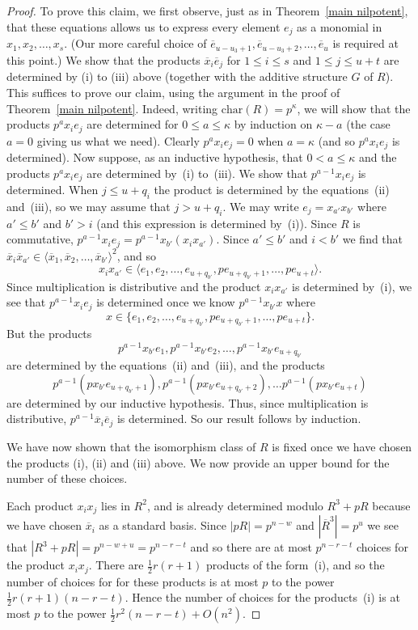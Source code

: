 \documentclass[12pt]{article}
\begin{document}
\begin{proof}
To prove this claim, we first observe, just as in Theorem~\ref{main nilpotent},  that these equations allows us to express every element $e_j$ as a monomial in $x_1,x_2,\ldots,x_s$. (Our more careful choice of $\overline{e}_{u-u_3+1},\overline{e}_{u-u_3+2},\ldots,\overline{e}_{u}$ is required at this point.) We show that the products $\overline{x}_{i}\overline{e}_{j}$ for $1\leq i\leq s$ and $1\leq j\leq u+t$ are determined by (i) to (iii) above (together with the additive structure $G$ of $R$). This suffices to prove our claim, using the argument in the proof of Theorem~\ref{main nilpotent}.   Indeed, writing $\mathrm{char}(R) = p^\kappa$, we will show that the products $p^ax_{i}e_{j}$ are determined for $0\leq a\leq \kappa$ by induction on $\kappa-a$ (the case $a=0$ giving us what we need). Clearly $p^ax_{i}e_{j}=0$ when $a=\kappa$ (and so $p^ax_{i}e_{j}$ is determined). Now suppose, as an inductive hypothesis, that $0<a\leq\kappa$ and the products $p^ax_{i}e_{j}$ are determined by~(i) to~(iii). We show that $p^{a-1}x_{i}e_{j}$ is determined. When $j\leq u+q_i$ the product is determined by the equations~(ii) and~(iii), so we may assume that $j>u+q_i$.  We may write $e_j=x_{a'}x_{b'}$ where $a'\leq b'$ and $b'>i$ (and this expression is determined by~(i)). Since $R$ is commutative, $p^{a-1}x_ie_j=p^{a-1}x_{b'}(x_ix_{a'})$. Since $a'\leq b'$ and $i<b'$ we find that $\overline{x}_i\overline{x}_{a'}\in\langle\overline{x}_1,\overline{x}_2,\ldots,\overline{x}_{b'}\rangle^2$, and so 
\[
x_ix_{a'}\in \langle e_1,e_2,\ldots,e_{u+q_{b'}},pe_{u+q_{b'}+1},\ldots,pe_{u+t}\rangle.
\]
Since multiplication is distributive and the product $x_ix_{a'}$ is determined by~(i), we see that $p^{a-1}x_ie_j$ is determined once we know $p^{a-1}x_{b'}x$ where
\[
x\in\{e_1,e_2,\ldots,e_{u+q_{b'}},pe_{u+q_{b'}+1},\ldots,pe_{u+t}\}.
\]
But the products
\[
p^{a-1}x_{b'}e_{1},p^{a-1}x_{b'}e_{2},\ldots,p^{a-1}x_{b'}e_{u+q_{b'}}
\]
are determined by the equations~(ii) and~(iii), and the products
\[
p^{a-1}(px_{b'}e_{u+q_{b'}+1}),p^{a-1}(px_{b'}e_{u+q_{b'}+2}),\ldots p^{a-1}(px_{b'}e_{u+t})
\]
are determined by our inductive hypothesis. Thus, since multiplication is distributive, $p^{a-1}\overline{x}_{i}\overline{e}_{j}$ is determined. So our result follows by induction. 

We have now shown that the isomorphism class of $R$ is fixed once we have chosen the products (i), (ii) and (iii) above. We now provide an upper bound for the number of these choices.

Each product $x_ix_j$ lies in $R^2$, and is already determined modulo $R^3+pR$ because we have chosen $\overline{x}_i$ as a standard basis. Since $|pR| = p^{n-w}$ and $|\overline{R}^3|=p^u$ we see that $|R^3+pR|=p^{n-w+u}=p^{n-r-t}$ and so there are at most $p^{n-r-t}$ choices for the product $x_ix_j$. There are $\frac{1}{2}r(r+1)$ products of the form~(i), and so the number of choices for for these products is at most $p$ to the power $\frac{1}{2}r(r+1)(n-r-t)$. Hence the number of choices for the products~(i) is at most $p$ to the power $\frac{1}{2}r^2(n-r-t)+O(n^2)$. 


\end{proof}
\end{document}
